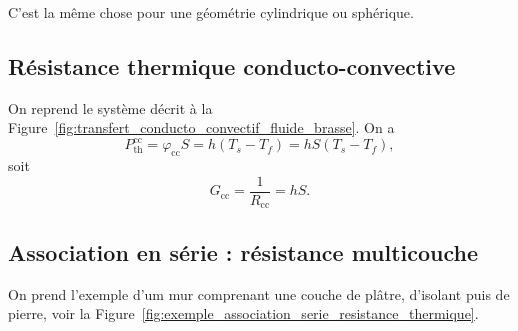             C'est la même chose pour une géométrie cylindrique ou sphérique.

    \subsection{Résistance thermique conducto-convective}

        On reprend le système décrit à la Figure~\ref{fig:transfert_conducto_convectif_fluide_brasse}. On a 
        \begin{equation}
            P_{\text{th}}^{\text{cc}}=\varphi_{\text{cc}}S=h(T_s-T_f)=hS(T_s-T_f),    
        \end{equation}
        soit
        \begin{equation}
            \boxed{
                G_{\text{cc}}=\frac{1}{R_{\text{cc}}}=hS.
            }
        \end{equation}

    \subsection{Association en série : résistance \og multicouche\fg}

        On prend l'exemple d'um mur comprenant une couche de plâtre, d'isolant puis de pierre, voir la Figure~\ref{fig:exemple_association_serie_resistance_thermique}.


